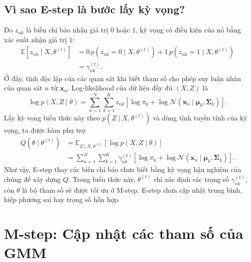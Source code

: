 \subsection{Vì sao E-step là bước lấy kỳ vọng?}
Do $z_{nk}$ là biến chỉ báo nhận giá trị $0$ hoặc $1$, kỳ vọng có điều kiện của nó bằng xác suất nhận giá trị $1$:
\begin{align}
\mathbb{E}[z_{nk}\mid X,\theta^{(t)}]
&=0\,p(z_{nk}=0\mid X,\theta^{(t)})
 +1\,p(z_{nk}=1\mid X,\theta^{(t)})\\
&=\gamma_{nk}^{(t)}.
\end{align}
Ở đây, tính độc lập của các quan sát khi biết tham số cho phép suy luận nhãn của quan sát $n$ từ $\mathbf{x}_n$. Log-likelihood của dữ liệu đầy đủ $(X,Z)$ là
\begin{equation}
\log p(X,Z\mid\theta)=\sum_{n=1}^N\sum_{k=1}^K z_{nk}
\left[\log\pi_k+\log\mathcal{N}(\mathbf{x}_n\mid\boldsymbol{\mu}_k,\boldsymbol{\Sigma}_k)\right].
\end{equation}
Lấy kỳ vọng biểu thức này theo $p(Z\mid X,\theta^{(t)})$ và dùng tính tuyến tính của kỳ vọng, ta được hàm phụ trợ
\begin{align}
Q(\theta\mid\theta^{(t)})
&=\mathbb{E}_{Z\mid X,\theta^{(t)}}[\log p(X,Z\mid\theta)]\\
&=\sum_{n=1}^N\sum_{k=1}^K\gamma_{nk}^{(t)}
\left[\log\pi_k+\log\mathcal{N}(\mathbf{x}_n\mid\boldsymbol{\mu}_k,\boldsymbol{\Sigma}_k)\right].
\label{eq:estep-Q}
\end{align}
Như vậy, E-step thay các biến chỉ báo chưa biết bằng kỳ vọng hậu nghiệm của chúng để xây dựng $Q$. Trong biểu thức này, $\theta^{(t)}$ chỉ xác định các trọng số $\gamma_{nk}^{(t)}$, còn $\theta$ là bộ tham số sẽ được tối ưu ở M-step. E-step chưa cập nhật trung bình, hiệp phương sai hay trọng số hỗn hợp.

\section{M-step: Cập nhật các tham số của GMM}
\label{sec:mstep}

